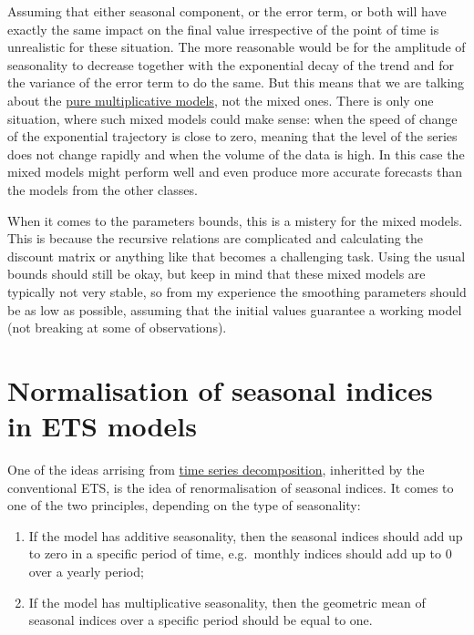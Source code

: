 \documentclass[
]{book}
\providecommand{\tightlist}{%
  \setlength{\itemsep}{0pt}\setlength{\parskip}{0pt}}
\theoremstyle{definition}
\theoremstyle{definition}
\theoremstyle{definition}
\theoremstyle{definition}
\theoremstyle{remark}
\begin{document}
Assuming that either seasonal component, or the error term, or both will have exactly the same impact on the final value irrespective of the point of time is unrealistic for these situation. The more reasonable would be for the amplitude of seasonality to decrease together with the exponential decay of the trend and for the variance of the error term to do the same. But this means that we are talking about the \protect\hyperlink{ADAMETSPureMultiplicative}{pure multiplicative models}, not the mixed ones. There is only one situation, where such mixed models could make sense: when the speed of change of the exponential trajectory is close to zero, meaning that the level of the series does not change rapidly and when the volume of the data is high. In this case the mixed models might perform well and even produce more accurate forecasts than the models from the other classes.

When it comes to the parameters bounds, this is a mistery for the mixed models. This is because the recursive relations are complicated and calculating the discount matrix or anything like that becomes a challenging task. Using the usual bounds should still be okay, but keep in mind that these mixed models are typically not very stable, so from my experience the smoothing parameters should be as low as possible, assuming that the initial values guarantee a working model (not breaking at some of observations).

\hypertarget{ADAMETSSeasonalNormalisation}{%
\section{Normalisation of seasonal indices in ETS models}\label{ADAMETSSeasonalNormalisation}}

One of the ideas arrising from \protect\hyperlink{ClassicalDecomposition}{time series decomposition}, inheritted by the conventional ETS, is the idea of renormalisation of seasonal indices. It comes to one of the two principles, depending on the type of seasonality:

\begin{enumerate}
\def\labelenumi{\arabic{enumi}.}
\tightlist
\item
  If the model has additive seasonality, then the seasonal indices should add up to zero in a specific period of time, e.g.~monthly indices should add up to 0 over a yearly period;
\item
  If the model has multiplicative seasonality, then the geometric mean of seasonal indices over a specific period should be equal to one.
\end{enumerate}
\end{document}
